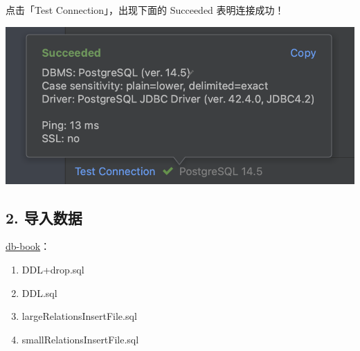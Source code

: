 \documentclass[aspectratio=169, 14pt]{beamer}
\begin{document}
\begin{frame}
点击「Test Connection」，出现下面的 \alert{Succeeded} 表明连接成功！

    \includegraphics[width=.8\textwidth]{week4/connection} 

\end{frame}

\begin{frame}[fragile]

    \section{\textcolor{darkmidnightblue}{2. 导入数据}}
    \href{https://github.com/ChenZhongPu/db-swufe/tree/master/db-book}{db-book}：
    \begin{enumerate}
        \item DDL+drop.sql
        \item DDL.sql
        \item largeRelationsInsertFile.sql
        \item smallRelationsInsertFile.sql
    \end{enumerate}
\end{frame}
\end{document}
